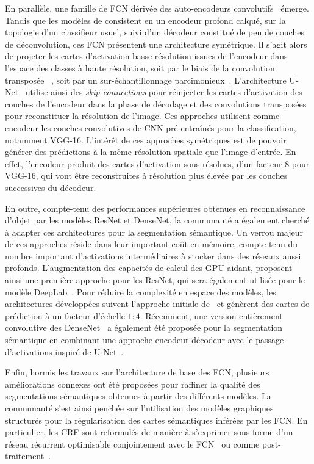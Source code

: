 En parallèle, une famille de \gls{FCN} dérivée des auto-encodeurs convolutifs~\cite{zhao_stacked_2015} émerge. Tandis que les modèles de \citet{long_fully_2015} consistent en un encodeur profond calqué, sur la topologie d'un classifieur usuel, suivi d'un décodeur constitué de peu de couches de déconvolution, ces \gls{FCN} présentent une architecture symétrique. Il s'agit alors de projeter les cartes d'activation basse résolution issues de l'encodeur dans l'espace des classes à haute résolution, soit par le biais de la convolution transposée ~\cite{nekrasov_global_2016,noh_learning_2015}, soit par un sur-échantillonnage parcimonieux~\cite{badrinarayanan_segnet_2017}. L'architecture U-Net~\cite{ronneberger_u-net_2015} utilise ainsi des \emph{skip connections} pour réinjecter les cartes d'activation des couches de l'encodeur dans la phase de décodage et des convolutions transposées pour reconstituer la résolution de l'image. Ces approches utilisent comme encodeur les couches convolutives de \gls{CNN} pré-entraînés pour la classification, notamment VGG-16. L'intérêt de ces approches symétriques est de pouvoir générer des prédictions à la même résolution spatiale que l'image d'entrée. En effet, l'encodeur produit des cartes d'activation sous-résolues, d'un facteur 8 pour VGG-16, qui vont être reconstruites à résolution plus élevée par les couches successives du décodeur.

En outre, compte-tenu des performances supérieures obtenues en reconnaissance d'objet par les modèles ResNet et DenseNet, la communauté a également cherché à adapter ces architectures pour la segmentation sémantique. Un verrou majeur de ces approches réside dans leur important coût en mémoire, compte-tenu du nombre important d'activations intermédiaires à stocker dans des réseaux aussi profonds. L'augmentation des capacités de calcul des \gls{GPU} aidant, \citet{wu_high-performance_2016} proposent ainsi une première approche pour les ResNet, qui sera également utilisée pour le modèle DeepLab~\cite{l._c._chen_deeplab_2018}. Pour réduire la complexité en espace des modèles, les architectures développées suivent l'approche initiale de~\cite{long_fully_2015} et génèrent des cartes de prédiction à un facteur d'échelle $1:4$. Récemment, une version entièrement convolutive des DenseNet~\cite{jegou_one_2017} a également été proposée pour la segmentation sémantique en combinant une approche encodeur-décodeur avec le passage d'activations inspiré de U-Net~\cite{ronneberger_u-net_2015}.

Enfin, hormis les travaux sur l'architecture de base des \gls{FCN}, plusieurs améliorations connexes ont été proposées pour raffiner la qualité des segmentations sémantiques obtenues à partir des différents modèles. La communauté s'est ainsi penchée sur l'utilisation des modèles graphiques structurés pour la régularisation des cartes sémantiques inférées par les \gls{FCN}. En particulier, les \gls{CRF} sont reformulés de manière à s'exprimer sous forme d'un réseau récurrent optimisable conjointement avec le \gls{FCN}~\cite{zheng_conditional_2015} ou comme post-traitement~\cite{arnab_higher_2015}.

